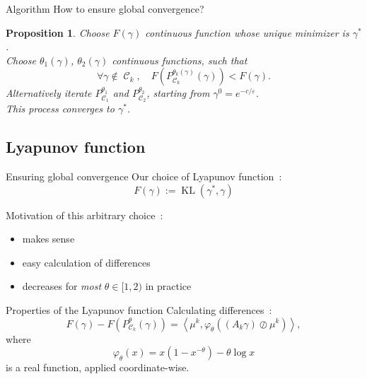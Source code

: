 \documentclass[compress]{beamer}
\newcommand{\scal}[2]{\left\langle #1 , #2 \right\rangle}
\DeclareMathOperator{\Ccal}{\mathcal{C}}
\DeclareMathOperator{\KL}{KL}
\renewcommand{\epsilon}{\varepsilon}
\newtheorem{proposition}{Proposition}
\begin{document}
\begin{frame}{Algorithm}
How to ensure global convergence?
\pause
\begin{proposition}
Choose $F(\gamma)$ continuous function whose unique minimizer is $\gamma^*$.\\
Choose $\theta_1(\gamma)$, $\theta_2(\gamma)$ continuous functions, such that
\begin{equation}\label{eq:cond_theta_k}
\forall \gamma \notin \Ccal_k,\quad
F(P_{\Ccal_k}^{\theta_k(\gamma)}(\gamma)) < F(\gamma).
\end{equation}
\pause
Alternatively iterate $P_{\Ccal_1}^{\theta_1}$ and $P_{\Ccal_2}^{\theta_2}$, starting from $\gamma^0 = e^{-c/\epsilon}$.\\
This process converges to $\gamma^*$.
\end{proposition}
\end{frame}

\subsection{Lyapunov function}
\begin{frame}{Ensuring global convergence}
	Our choice of Lyapunov function~:
	\[F(\gamma) := \KL(\gamma^*,\gamma)\]
	\pause
	
	Motivation of this arbitrary choice~:
	\begin{itemize}
		\item makes sense
		\item easy calculation of differences
		\item decreases for \emph{most} $\theta \in [1,2)$ in practice
	\end{itemize}
	
\end{frame}

\begin{frame}{Properties of the Lyapunov function}
Calculating differences~:
\begin{equation} \label{eq:kl_diff_scal}
F(\gamma) - F(P^\theta_{\Ccal_k}(\gamma)) = 
\scal{\mu^k}{\varphi_\theta \left((A_k \gamma) \oslash \mu^k \right)},
\end{equation}
where
\begin{equation}
\varphi_\theta(x) = x(1-x^{-\theta}) - \theta \log x
\end{equation}
is a real function, applied coordinate-wise.
\end{frame}
\end{document}
